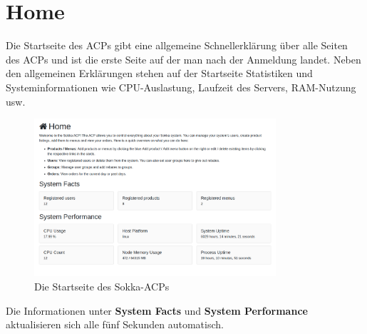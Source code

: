 \section{Home}

Die Startseite des ACPs gibt eine allgemeine Schnellerklärung über alle Seiten des ACPs und ist die erste Seite auf der man nach der Anmeldung landet. Neben den allgemeinen Erklärungen stehen auf der Startseite Statistiken und Systeminformationen wie CPU-Auslastung, Laufzeit des Servers, RAM-Nutzung usw.

\begin{figure}[ht]
    \centering
    \includegraphics[width=0.8\textwidth]{images/ACP/home.png}
    \caption{Die Startseite des Sokka-ACPs}
\end{figure}

Die Informationen unter \textbf{System Facts} und \textbf{System Performance} aktualisieren sich alle fünf Sekunden automatisch.
